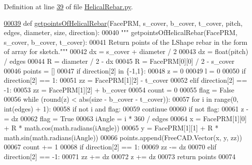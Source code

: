 Definition at line \hyperlink{HelicalRebar_8py_source_l00039}{39} of file \hyperlink{HelicalRebar_8py_source}{Helical\+Rebar.\+py}.


\begin{DoxyCode}
\hypertarget{namespaceHelicalRebar.tex_l00039}{}\hyperlink{namespaceHelicalRebar_a4fcf2dabc065c39ce5c8cf6995051352}{00039} \textcolor{keyword}{def }\hyperlink{namespaceHelicalRebar_a4fcf2dabc065c39ce5c8cf6995051352}{getpointsOfHelicalRebar}(FacePRM, s\_cover, b\_cover, t\_cover, pitch, edges, 
      diameter, size, direction):
00040     \textcolor{stringliteral}{""" getpointsOfHelicalRebar(FacePRM, s\_cover, b\_cover, t\_cover):}
00041 \textcolor{stringliteral}{    Return points of the LShape rebar in the form of array for sketch."""}
00042     dx = s\_cover + diameter / 2
00043     dz = float(pitch) / edges
00044     R = diameter / 2 - dx
00045     R = FacePRM[0][0] / 2 - s\_cover
00046     points = []
00047     \textcolor{keywordflow}{if} direction[2] \textcolor{keywordflow}{in} \{-1,1\}:
00048         z = 0
00049         l = 0
00050         \textcolor{keywordflow}{if} direction[2] == 1:
00051             zz = FacePRM[1][2] - t\_cover
00052         \textcolor{keywordflow}{elif} direction[2] == -1:
00053             zz = FacePRM[1][2] + b\_cover
00054         count = 0
00055         flag = \textcolor{keyword}{False}
00056         \textcolor{keywordflow}{while} (round(z) < abs(size - b\_cover - t\_cover)):
00057             \textcolor{keywordflow}{for} i \textcolor{keywordflow}{in} range(0, int(edges) + 1):
00058                 \textcolor{keywordflow}{if} \textcolor{keywordflow}{not} i \textcolor{keywordflow}{and} flag:
00059                     \textcolor{keywordflow}{continue}
00060                 \textcolor{keywordflow}{if} \textcolor{keywordflow}{not} flag:
00061                     z -= dz
00062                     flag = \textcolor{keyword}{True}
00063                 iAngle = i * 360 / edges
00064                 x =  FacePRM[1][0] + R * math.cos(math.radians(iAngle))
00065                 y =  FacePRM[1][1] + R * math.sin(math.radians(iAngle))
00066                 points.append(FreeCAD.Vector(x, y, zz))
00067                 count += 1
00068                 \textcolor{keywordflow}{if} direction[2] == 1:
00069                     zz -= dz
00070                 \textcolor{keywordflow}{elif} direction[2] == -1:
00071                     zz += dz
00072                 z += dz
00073     \textcolor{keywordflow}{return} points
00074 
\end{DoxyCode}
